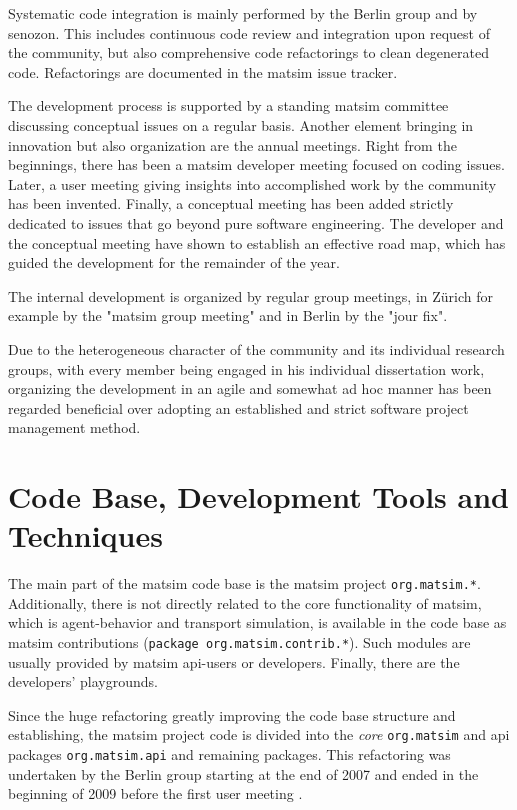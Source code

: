 Systematic code integration is mainly performed by the Berlin group and by \gls{senozon}. This includes continuous code review and integration upon request of the community, but also comprehensive code refactorings to clean degenerated code. Refactorings are documented in the \gls{matsim} issue tracker.

The development process is supported by a standing \gls{matsim} committee discussing conceptual issues on a regular basis. Another element bringing in innovation but also organization are the annual meetings. Right from the beginnings, there has been a \gls{matsim} developer meeting focused on coding issues. Later, a user meeting giving insights into accomplished work by the community has been invented. Finally, a conceptual meeting has been added strictly dedicated to issues that go beyond pure software engineering. The developer and the conceptual meeting have shown to establish an effective road map, which has guided the development for the remainder of the year. 

The internal development is organized by regular group meetings, in Zürich for example by the "\gls{matsim} group meeting" and in Berlin by the "jour fix". 

Due to the heterogeneous character of the community and its individual research groups, with every member being engaged in his individual dissertation work, organizing the development in an agile and somewhat ad hoc manner has been regarded beneficial over adopting an established and strict software project management method.

\section{Code Base, Development Tools and Techniques}
The main part of the \gls{matsim} code base is the \gls{matsim} project \lstinline|org.matsim.*|. Additionally, there is not directly related to the core functionality of \gls{matsim}, which is agent-behavior and transport simulation, is available in the code base as \gls{matsim} contributions (\lstinline|package org.matsim.contrib.*|). Such modules are usually provided by \gls{matsim} \gls{api}-users or developers. Finally, there are the developers' playgrounds.

Since the huge refactoring greatly improving the code base structure and establishing, the \gls{matsim} project code is divided into the \emph{core} \lstinline|org.matsim| and \gls{api} packages \lstinline|org.matsim.api| and remaining packages. This refactoring was undertaken by the Berlin group starting at the end of 2007 and ended in the beginning of 2009 before the first user meeting .

